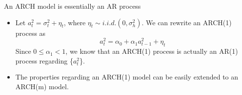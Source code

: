 \documentclass[presentation,10pt]{beamer}
\begin{document}
\begin{frame}[label={sec:org1d35dd4}]{An ARCH model is essentially an AR process}
\begin{itemize}
\item Let \(a^2_t = \sigma^2_t + \eta_t\), where \(\eta_t \sim i.i.d.(0,
  \sigma^2_h)\). We can rewrite an ARCH(1) process as
\[ a^2_t = \alpha_0 + \alpha_1 a^2_{t-1} + \eta_t \]
Since \(0 \leq \alpha_1 < 1\), we know that an ARCH(1) process is
actually an AR(1) process regarding \{\(a^2_t\)\}.

\item The properties regarding an ARCH(1) model can be easily extended to
an ARCH(m) model.
\end{itemize}
\end{frame}
\end{document}
